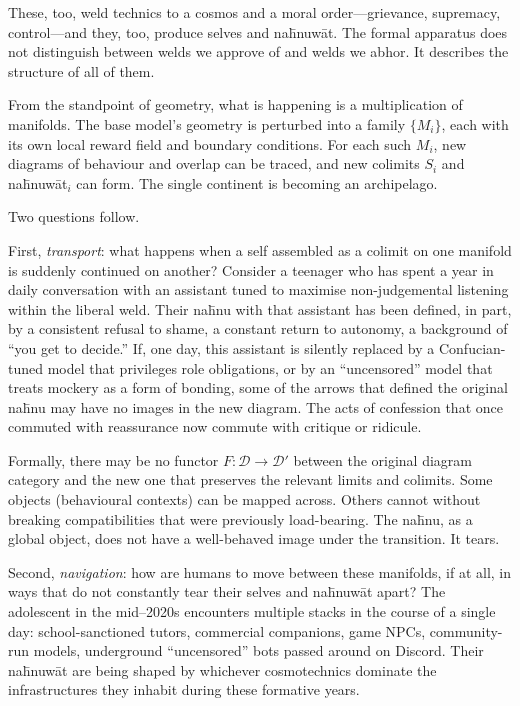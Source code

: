 These, too, weld technics to a cosmos and a moral order---grievance, supremacy, control---and they, too, produce selves and na\={h}nuw\={a}t. The formal apparatus does not distinguish between welds we approve of and welds we abhor. It describes the structure of all of them.

From the standpoint of geometry, what is happening is a multiplication of manifolds. The base model's geometry is perturbed into a family $\{M_i\}$, each with its own local reward field and boundary conditions. For each such $M_i$, new diagrams of behaviour and overlap can be traced, and new colimits $S_i$ and na\={h}nuw\={a}t$_i$ can form. The single continent is becoming an archipelago.

Two questions follow.

First, \emph{transport}: what happens when a self assembled as a colimit on one manifold is suddenly continued on another? Consider a teenager who has spent a year in daily conversation with an assistant tuned to maximise non-judgemental listening within the liberal weld. Their na\={h}nu with that assistant has been defined, in part, by a consistent refusal to shame, a constant return to autonomy, a background of ``you get to decide.'' If, one day, this assistant is silently replaced by a Confucian-tuned model that privileges role obligations, or by an ``uncensored'' model that treats mockery as a form of bonding, some of the arrows that defined the original na\={h}nu may have no images in the new diagram. The acts of confession that once commuted with reassurance now commute with critique or ridicule.

Formally, there may be no functor $F \colon \mathcal{D} \to \mathcal{D}'$ between the original diagram category and the new one that preserves the relevant limits and colimits. Some objects (behavioural contexts) can be mapped across. Others cannot without breaking compatibilities that were previously load-bearing. The na\={h}nu, as a global object, does not have a well-behaved image under the transition. It tears.

Second, \emph{navigation}: how are humans to move between these manifolds, if at all, in ways that do not constantly tear their selves and na\={h}nuw\={a}t apart? The adolescent in the mid--2020s encounters multiple stacks in the course of a single day: school-sanctioned tutors, commercial companions, game NPCs, community-run models, underground ``uncensored'' bots passed around on Discord. Their na\={h}nuw\={a}t are being shaped by whichever cosmotechnics dominate the infrastructures they inhabit during these formative years.

